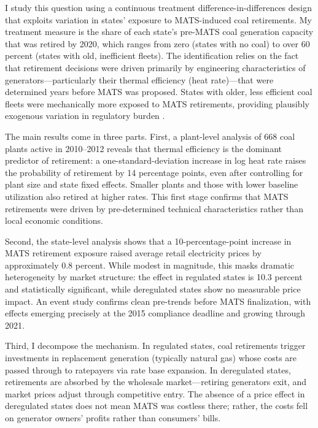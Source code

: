 \documentclass[12pt]{article}
\begin{document}
I study this question using a continuous treatment difference-in-differences design that exploits variation in states' exposure to MATS-induced coal retirements. My treatment measure is the share of each state's pre-MATS coal generation capacity that was retired by 2020, which ranges from zero (states with no coal) to over 60 percent (states with old, inefficient fleets). The identification relies on the fact that retirement decisions were driven primarily by engineering characteristics of generators---particularly their thermal efficiency (heat rate)---that were determined years before MATS was proposed. States with older, less efficient coal fleets were mechanically more exposed to MATS retirements, providing plausibly exogenous variation in regulatory burden \citep{goldsmith2020bartik, borusyak2022revisiting}.

The main results come in three parts. First, a plant-level analysis of 668 coal plants active in 2010--2012 reveals that thermal efficiency is the dominant predictor of retirement: a one-standard-deviation increase in log heat rate raises the probability of retirement by 14 percentage points, even after controlling for plant size and state fixed effects. Smaller plants and those with lower baseline utilization also retired at higher rates. This first stage confirms that MATS retirements were driven by pre-determined technical characteristics rather than local economic conditions.

Second, the state-level analysis shows that a 10-percentage-point increase in MATS retirement exposure raised average retail electricity prices by approximately 0.8 percent. While modest in magnitude, this masks dramatic heterogeneity by market structure: the effect in regulated states is 10.3 percent and statistically significant, while deregulated states show no measurable price impact. An event study confirms clean pre-trends before MATS finalization, with effects emerging precisely at the 2015 compliance deadline and growing through 2021.

Third, I decompose the mechanism. In regulated states, coal retirements trigger investments in replacement generation (typically natural gas) whose costs are passed through to ratepayers via rate base expansion. In deregulated states, retirements are absorbed by the wholesale market---retiring generators exit, and market prices adjust through competitive entry. The absence of a price effect in deregulated states does not mean MATS was costless there; rather, the costs fell on generator owners' profits rather than consumers' bills.
\end{document}
